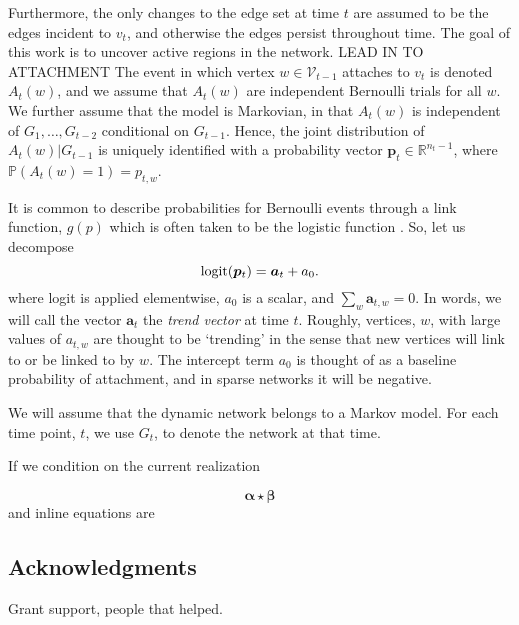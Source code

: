 \documentclass[twoside,11pt]{article}
\newcommand{\pp}{\mathbb} %
\newcommand{\cc}{\mathcal} %
\def\beq{\begin{equation}} %
\def\eeq{\end{equation}}
\newcommand{\teq}[1]{\smash{$#1$}}
\newcommand{\logit}{{\rm logit}}
\begin{document}
Furthermore, the only changes to the edge set at time $t$ are assumed to be the edges incident to $v_t$, and otherwise the edges persist throughout time.
The goal of this work is to uncover active regions in the network.
LEAD IN TO ATTACHMENT
The event in which vertex $w \in \cc V_{t-1}$ attaches to $v_t$ is denoted $A_t(w)$, and we assume that $A_t(w)$ are independent Bernoulli trials for all $w$.
We further assume that the model is Markovian, in that $A_t(w)$ is independent of $G_1,\ldots, G_{t-2}$ conditional on $G_{t-1}$.
Hence, the joint distribution of $A_t(w)|G_{t-1}$ is uniquely identified with a probability vector $\bm p_t \in \pp R^{n_t - 1}$, where $\pp P(A_t(w) = 1) = p_{t,w}$.

It is common to describe probabilities for Bernoulli events through a link function, $g(p)$ which is often taken to be the logistic function \teq{\logit(p) = \log\left(\frac{p}{1-p}\right)}.
So, let us decompose
\beq
\logit(\bm p_t) = \bm a_t + a_0.
\eeq
where logit is applied elementwise, $a_0$ is a scalar, and $\sum_w \bm a_{t,w} = 0$.
In words, we will call the vector $\bm a_t$ the {\em trend vector} at time $t$.
Roughly, vertices, $w$, with large values of $a_{t,w}$ are thought to be `trending' in the sense that new vertices will link to or be linked to by $w$.
The intercept term $a_0$ is thought of as a baseline probability of attachment, and in sparse networks it will be negative.




We will assume that the dynamic network belongs to a Markov model.
For each time point, $t$, we use $G_t$, to denote the network at that time.

If we condition on the current realization 

\beq 
\label{eq:eqname}
\bm \alpha \star \bm \beta
\eeq
and inline equations are \teq{\sum \alpha + \beta}


\subsection*{Acknowledgments}

Grant support, people that helped.



\end{document}
